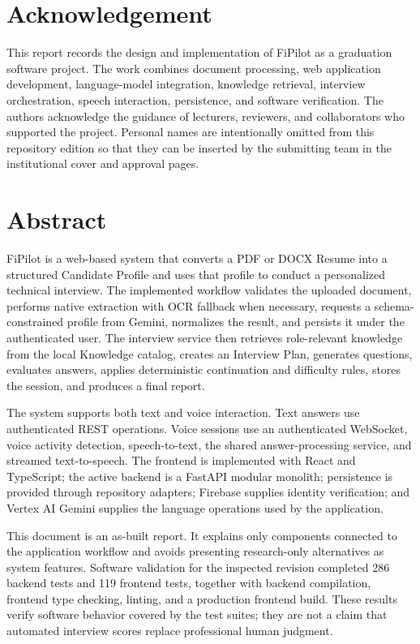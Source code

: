 \chapter*{Acknowledgement}

This report records the design and implementation of FiPilot as a graduation software project. The work combines document processing, web application development, language-model integration, knowledge retrieval, interview orchestration, speech interaction, persistence, and software verification. The authors acknowledge the guidance of lecturers, reviewers, and collaborators who supported the project. Personal names are intentionally omitted from this repository edition so that they can be inserted by the submitting team in the institutional cover and approval pages.

\chapter*{Abstract}

FiPilot is a web-based system that converts a PDF or DOCX Resume into a structured Candidate Profile and uses that profile to conduct a personalized technical interview. The implemented workflow validates the uploaded document, performs native extraction with OCR fallback when necessary, requests a schema-constrained profile from Gemini, normalizes the result, and persists it under the authenticated user. The interview service then retrieves role-relevant knowledge from the local Knowledge catalog, creates an Interview Plan, generates questions, evaluates answers, applies deterministic continuation and difficulty rules, stores the session, and produces a final report.

The system supports both text and voice interaction. Text answers use authenticated REST operations. Voice sessions use an authenticated WebSocket, voice activity detection, speech-to-text, the shared answer-processing service, and streamed text-to-speech. The frontend is implemented with React and TypeScript; the active backend is a FastAPI modular monolith; persistence is provided through repository adapters; Firebase supplies identity verification; and Vertex AI Gemini supplies the language operations used by the application.

This document is an as-built report. It explains only components connected to the application workflow and avoids presenting research-only alternatives as system features. Software validation for the inspected revision completed 286 backend tests and 119 frontend tests, together with backend compilation, frontend type checking, linting, and a production frontend build. These results verify software behavior covered by the test suites; they are not a claim that automated interview scores replace professional human judgment.

